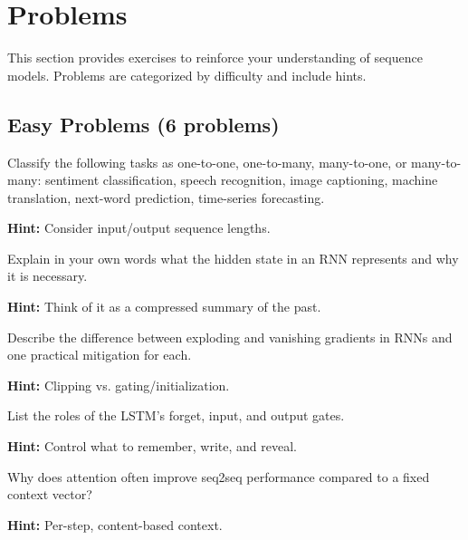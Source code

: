 
\section{Problems }
\label{sec:ch10-problems}

This section provides exercises to reinforce your understanding of sequence models. Problems are categorized by difficulty and include hints.

\subsection{Easy Problems (6 problems)}

\begin{problem}
Classify the following tasks as one-to-one, one-to-many, many-to-one, or many-to-many: sentiment classification, speech recognition, image captioning, machine translation, next-word prediction, time-series forecasting.

\textbf{Hint:} Consider input/output sequence lengths.
\end{problem}

\begin{problem}
Explain in your own words what the hidden state in an RNN represents and why it is necessary.

\textbf{Hint:} Think of it as a compressed summary of the past.
\end{problem}

\begin{problem}
Describe the difference between exploding and vanishing gradients in RNNs and one practical mitigation for each.

\textbf{Hint:} Clipping vs. gating/initialization.
\end{problem}

\begin{problem}
List the roles of the LSTM's forget, input, and output gates.

\textbf{Hint:} Control what to remember, write, and reveal.
\end{problem}

\begin{problem}
Why does attention often improve seq2seq performance compared to a fixed context vector?

\textbf{Hint:} Per-step, content-based context.
\end{problem}

